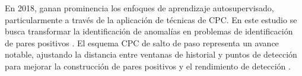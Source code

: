 En 2018, ganan prominencia los enfoques de aprendizaje autosupervisado, particularmente a través de la aplicación de técnicas de CPC. En este estudio se busca transformar la identificación de anomalías en problemas de identificación de pares positivos \cite{oord_representation_2018}. El esquema CPC de salto de paso representa un avance notable, ajustando la distancia entre ventanas de historial y puntos de detección para mejorar la construcción de pares positivos y el rendimiento de detección \cite{zhang_skip-step_2024}.